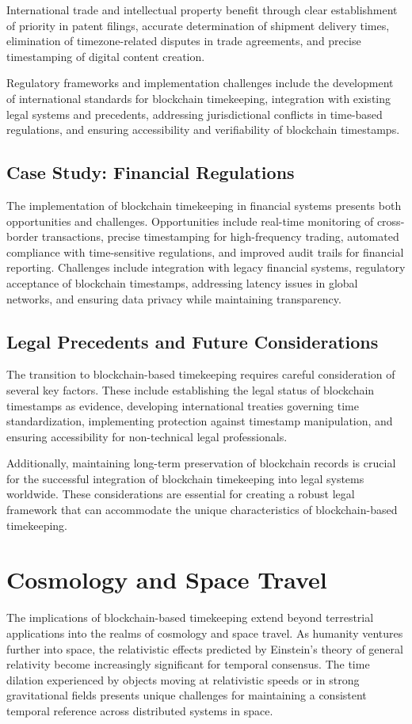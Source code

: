 \documentclass[12pt]{report}
\begin{document}
International trade and intellectual property benefit through clear establishment of priority in patent filings, accurate determination of shipment delivery times, elimination of timezone-related disputes in trade agreements, and precise timestamping of digital content creation. 

Regulatory frameworks and implementation challenges include the development of international standards for blockchain timekeeping, integration with existing legal systems and precedents, addressing jurisdictional conflicts in time-based regulations, and ensuring accessibility and verifiability of blockchain timestamps.

\subsection{Case Study: Financial Regulations}
The implementation of blockchain timekeeping in financial systems presents both opportunities and challenges. Opportunities include real-time monitoring of cross-border transactions, precise timestamping for high-frequency trading, automated compliance with time-sensitive regulations, and improved audit trails for financial reporting. Challenges include integration with legacy financial systems, regulatory acceptance of blockchain timestamps, addressing latency issues in global networks, and ensuring data privacy while maintaining transparency.

\subsection{Legal Precedents and Future Considerations}
The transition to blockchain-based timekeeping requires careful consideration of several key factors. These include establishing the legal status of blockchain timestamps as evidence, developing international treaties governing time standardization, implementing protection against timestamp manipulation, and ensuring accessibility for non-technical legal professionals. 

Additionally, maintaining long-term preservation of blockchain records is crucial for the successful integration of blockchain timekeeping into legal systems worldwide. These considerations are essential for creating a robust legal framework that can accommodate the unique characteristics of blockchain-based timekeeping.

\section{Cosmology and Space Travel}
The implications of blockchain-based timekeeping extend beyond terrestrial applications into the realms of cosmology and space travel. As humanity ventures further into space, the relativistic effects predicted by Einstein's theory of general relativity become increasingly significant for temporal consensus. The time dilation experienced by objects moving at relativistic speeds or in strong gravitational fields presents unique challenges for maintaining a consistent temporal reference across distributed systems in space.
\end{document}
